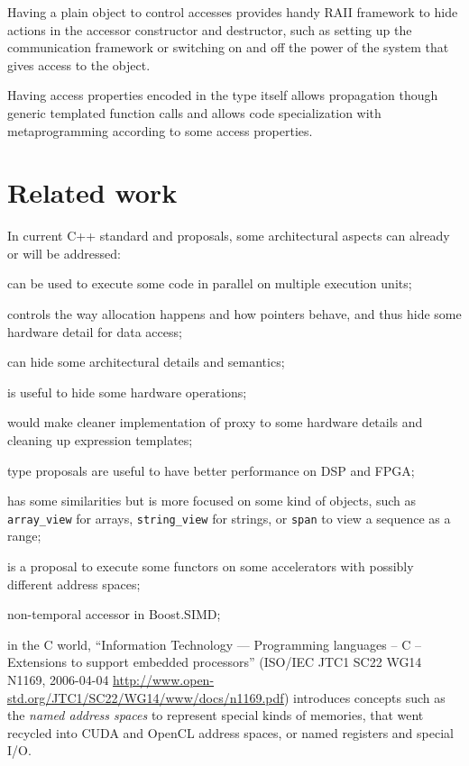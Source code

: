 \documentclass[a4paper]{article}
\begin{document}
Having a plain object to control accesses provides handy RAII
framework to hide actions in the accessor constructor and destructor,
such as setting up the communication framework or switching on and off
the power of the system that gives access to the object.

Having access properties encoded in the type itself allows propagation
though generic templated function calls and allows code specialization
with metaprogramming according to some access properties.


\section{Related work}
\label{sec:related-work}

In current C++ standard and proposals, some architectural aspects can
already or will be addressed:
\begin{description}
\item[\texttt{thread}] can be used to execute some code in parallel
  on multiple execution units;
\item[\texttt{allocator}] controls the way allocation happens and how
  pointers behave, and thus hide some hardware detail for data access;
\item[constructors and destructors] can hide some architectural details
  and semantics;
\item[operator overloading] is useful to hide some hardware
  operations;
\item[\texttt{auto} operator overloading] would make cleaner implementation of
  proxy to some hardware details and cleaning up expression templates;
\item[fixed-point] type proposals are useful to have better
  performance on DSP and FPGA;
\item[the concept of view] has some similarities but is more focused
  on some kind of objects, such as \lstinline|array_view| for arrays,
  \lstinline|string_view| for strings, or \lstinline|span| to view a
  sequence as a range;
\item[SYCL] is a proposal to execute some functors on some
  accelerators with possibly different address spaces;
\item non-temporal accessor in Boost.SIMD;
\item[ISO/IEC TR 18037] in the C world, ``Information Technology ---
  Programming languages -- C -- Extensions to support embedded
  processors'' (ISO/IEC JTC1 SC22 WG14 N1169, 2006-04-04
  \url{http://www.open-std.org/JTC1/SC22/WG14/www/docs/n1169.pdf})
  introduces concepts such as the \emph{named address spaces} to
  represent special kinds of memories, that went recycled into CUDA
  and OpenCL address spaces, or named registers and special I/O.
\end{description}
\end{document}
